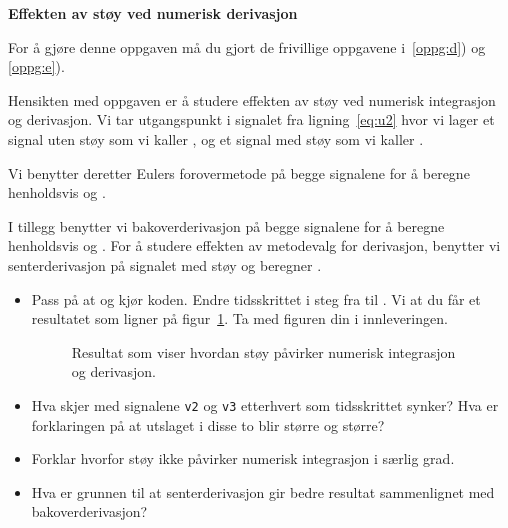 \item
{\bf Effekten av støy ved numerisk derivasjon}
\label{oppg:g}

For å gjøre denne oppgaven må du gjort 
de frivillige oppgavene i~\ref{oppg:d}) og \ref{oppg:e}). 

Hensikten med oppgaven er å studere effekten av støy ved numerisk
integrasjon og derivasjon. Vi tar utgangspunkt i signalet fra
ligning~\eqref{eq:u2} hvor vi lager et signal uten støy som vi kaller
, og et signal med støy som vi kaller .

Vi benytter deretter Eulers forovermetode på begge signalene for å
beregne henholdsvis  og .

I tillegg benytter vi bakoverderivasjon på begge signalene for å
beregne henholdsvis  og .
For å studere effekten av metodevalg for derivasjon,
benytter vi senterderivasjon på signalet med støy og beregner . 

\begin{itemize}
\item 
  Pass på at  og kjør koden.
  Endre tidsskrittet i steg fra   til
  .
 Vi at du får et resultatet som ligner på figur~\ref{fig:fig1g_1}.
  Ta med figuren din i innleveringen.
 \begin{figure}[H]
      \centering
      \hspace*{0mm}
      \caption{Resultat som viser hvordan støy påvirker numerisk
        integrasjon og derivasjon.}
      \label{fig:fig1g_1}
    \end{figure}


\item  Hva skjer med signalene
  {\tt v2} og {\tt v3} etterhvert som tidsskrittet synker?
  Hva er forklaringen på at utslaget i
  disse to blir større og større?


\item Forklar hvorfor støy ikke påvirker numerisk
  integrasjon i særlig grad. 

\item Hva er grunnen til at senterderivasjon gir bedre resultat
  sammenlignet med bakoverderivasjon?
 
   
\end{itemize}

